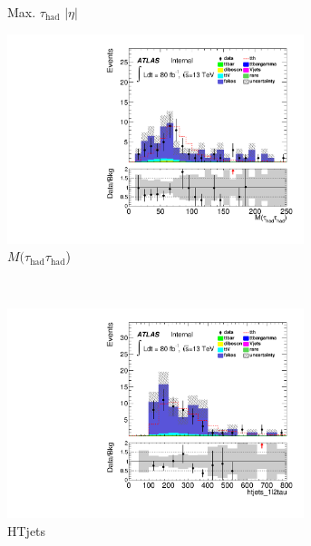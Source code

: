 \begin{figure}[h]
\begin{subfigure}[b]{0.45\textwidth}
 \caption{Max. $\tau_{\text{had}}$ $|\eta|$}
\end{subfigure}
\begin{subfigure}[b]{0.45\textwidth}
 \includegraphics[width=0.95\textwidth,angle=-90]{fig/lowBDTOSFakes/mtautau_1l2tau_F.pdf}
 \caption{$M(\tau_{\text{had}}\tau_{\text{had}}$)}
\end{subfigure}\\
\begin{subfigure}[b]{0.45\textwidth}
 \includegraphics[width=0.95\textwidth,angle=-90]{fig/lowBDTOSFakes/htjets_1l2tau_F.pdf}
 \caption{HTjets}
\end{subfigure}
\begin{subfigure}[b]{0.45\textwidth}

\end{subfigure}
\end{figure}
